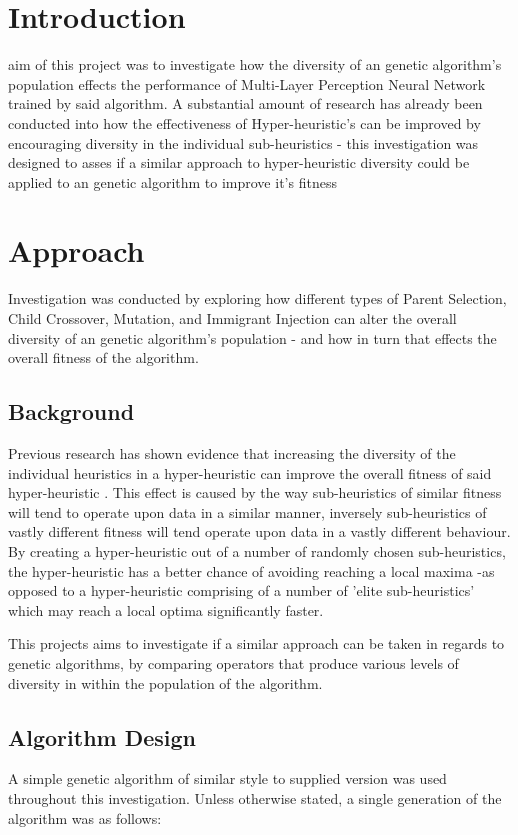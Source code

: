 
\section{Introduction}
	 aim of this project was to investigate how the diversity of an genetic algorithm's population effects the performance of Multi-Layer Perception Neural Network trained by said algorithm. 
	A substantial amount of research has already been conducted into how the effectiveness of Hyper-heuristic's can be improved by encouraging diversity in the individual sub-heuristics - this investigation was designed to asses if a similar approach to hyper-heuristic diversity could be applied to an genetic algorithm to improve it's fitness
	
\section{Approach}
	Investigation was conducted by exploring how different types of Parent Selection, Child Crossover, Mutation, and Immigrant Injection can alter the overall diversity of an genetic algorithm's population - and how in turn that effects the overall fitness of the algorithm.
	
	\subsection{Background}
		Previous research has shown evidence that increasing the diversity of the individual heuristics in  a hyper-heuristic can improve the overall fitness of said hyper-heuristic\cite{Hong16112004} \cite{hart2017constructing}. This effect is caused by the way sub-heuristics of similar fitness will tend to operate upon data in a similar manner, inversely sub-heuristics of vastly different fitness will tend operate upon data in a vastly different behaviour. By creating a hyper-heuristic out of a number of randomly chosen sub-heuristics, the hyper-heuristic has a better chance of avoiding reaching a local maxima -as opposed to a hyper-heuristic comprising of a number of 'elite sub-heuristics' which may reach a local optima significantly faster.
		
		This projects aims to investigate if a similar approach can be taken in regards to genetic algorithms, by comparing operators that produce various levels of diversity in within the population of the algorithm.
	
	\subsection{Algorithm Design}
		A simple genetic algorithm of similar style to supplied version was used throughout this investigation. Unless otherwise stated, a single generation of the algorithm was as follows:

